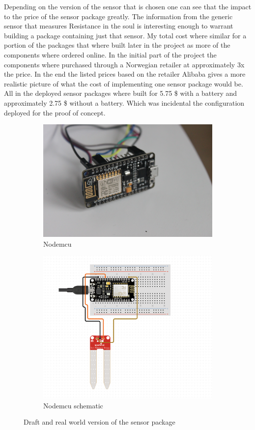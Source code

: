 \documentclass[]{uiophd}
\begin{document}
Depending on the version of the sensor that is chosen one can see that the impact to the price of the sensor package greatly. The information from the generic sensor that measures Resistance in the soul is interesting enough to warrant building a package containing just that sensor. My total cost where similar for a portion of the packages that where built later in the project as  more of the components where ordered online. In the initial part of the project the components where purchased through a Norwegian retailer at approximately 3x the price. In the end the listed prices based on the retailer Alibaba gives a more realistic picture of what the cost of implementing one sensor package would be. All in the deployed sensor packages where built for 5.75 \$ with a battery and approximately 2.75 \$ without a battery. Which was incidental the configuration deployed for the proof of concept.


\begin{figure}
\centering
\begin{subfigure}{.5\textwidth}
  \centering
  \includegraphics[width=.9\linewidth]{nodemcu.jpg}
  \caption{Nodemcu}
  \label{fig:sub1}
\end{subfigure}%
\begin{subfigure}{.5\textwidth}
  \centering
  \includegraphics[width=.9\linewidth]{nodemcu_schematic.png}
  \caption{Nodemcu schematic}
  \label{fig:sub2}
\end{subfigure}
\caption{Draft and real world version of the sensor package}
\label{fig:test}
\end{figure}
\end{document}
